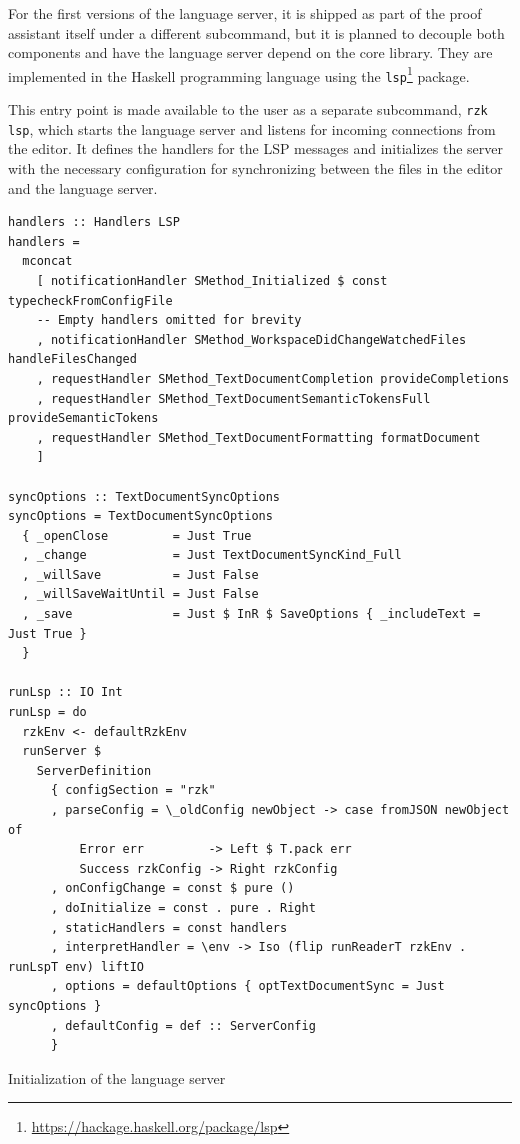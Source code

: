 For the first versions of the language server, it is shipped as part of the \Rzk{} proof assistant itself under a different subcommand, but it is planned to decouple both components and have the language server depend on the core library. They are implemented in the Haskell programming language using the \texttt{lsp}\footnote{\url{https://hackage.haskell.org/package/lsp}} package.

This entry point is made available to the user as a separate subcommand, \texttt{rzk lsp},
which starts the language server and listens for incoming connections from the editor.
It defines the handlers for the LSP messages and initializes the server with the necessary configuration
for synchronizing between the files in the editor and the language server.

\begin{listing}
  \begin{verbatim}
handlers :: Handlers LSP
handlers =
  mconcat
    [ notificationHandler SMethod_Initialized $ const typecheckFromConfigFile
    -- Empty handlers omitted for brevity
    , notificationHandler SMethod_WorkspaceDidChangeWatchedFiles handleFilesChanged
    , requestHandler SMethod_TextDocumentCompletion provideCompletions
    , requestHandler SMethod_TextDocumentSemanticTokensFull provideSemanticTokens
    , requestHandler SMethod_TextDocumentFormatting formatDocument
    ]

syncOptions :: TextDocumentSyncOptions
syncOptions = TextDocumentSyncOptions
  { _openClose         = Just True
  , _change            = Just TextDocumentSyncKind_Full
  , _willSave          = Just False
  , _willSaveWaitUntil = Just False
  , _save              = Just $ InR $ SaveOptions { _includeText = Just True }
  }

runLsp :: IO Int
runLsp = do
  rzkEnv <- defaultRzkEnv
  runServer $
    ServerDefinition
      { configSection = "rzk"
      , parseConfig = \_oldConfig newObject -> case fromJSON newObject of
          Error err         -> Left $ T.pack err
          Success rzkConfig -> Right rzkConfig
      , onConfigChange = const $ pure ()
      , doInitialize = const . pure . Right
      , staticHandlers = const handlers
      , interpretHandler = \env -> Iso (flip runReaderT rzkEnv . runLspT env) liftIO
      , options = defaultOptions { optTextDocumentSync = Just syncOptions }
      , defaultConfig = def :: ServerConfig
      }
  \end{verbatim}
  \caption{Initialization of the language server}
  \label{code:server-init}
\end{listing}

